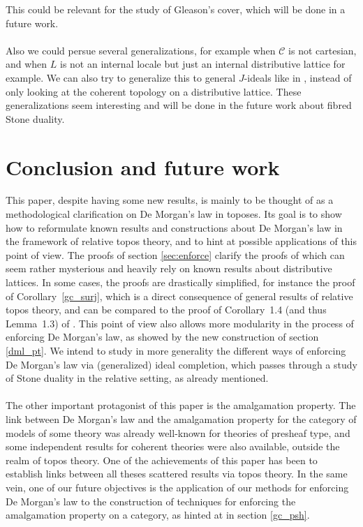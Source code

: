 \documentclass{article}
\begin{document}
This could be relevant for the study of Gleason's cover, which will be done in a future work. \\
\\
Also we could persue several generalizations, for example when $\mathcal{C}$ is not cartesian, and when $L$ is not an internal locale but just an internal distributive lattice for example. We can also try to generalize this to general $J$-ideals like in \cite{caramello2011topos}, instead of only looking at the coherent topology on a distributive lattice. These generalizations seem interesting and will be done in the future work about fibred Stone duality.


\section{Conclusion and future work}
This paper, despite having some new results, is mainly to be thought of as a methodological clarification on De Morgan's law in toposes. Its goal is to show how to reformulate known results and constructions about De Morgan's law in the framework of relative topos theory, and to hint at possible applications of this point of view. The proofs of section \ref{sec:enforce} clarify the proofs of \cite{johnstone1980gleason} which can seem rather mysterious and heavily rely on known results about distributive lattices. In some cases, the proofs are drastically simplified, for instance the proof of Corollary~\ref{gc_surj}, which is a direct consequence of general results of relative topos theory, and can be compared to the proof of Corollary~1.4 (and thus Lemma~1.3) of \cite{johnstone1980gleason}. This point of view also allows more modularity in the process of enforcing De Morgan's law, as showed by the new construction of section \ref{dml_pt}. We intend to study in more generality the different ways of enforcing De Morgan's law via (generalized) ideal completion, which passes through a study of Stone duality in the relative setting, as already mentioned. \\
\\
The other important protagonist of this paper is the amalgamation property. The link between De Morgan's law and the amalgamation property for the category of models of some theory was already well-known for theories of presheaf type, and some independent results for coherent theories were also available, outside the realm of topos theory. One of the achievements of this paper has been to establish links between all theses scattered results via topos theory. In the same vein, one of our future objectives is the application of our methods for enforcing De Morgan's law to the construction of techniques for enforcing the amalgamation property on a category, as hinted at in section \ref{gc_psh}.
\end{document}

